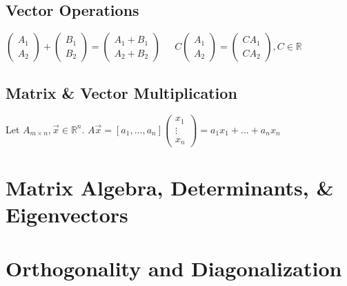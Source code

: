 \documentclass[5pt]{article}
\begin{document}
\begin{multicols}{2}
\subsection{Vector Operations}
$\begin{pmatrix}A_1\\ A_2\end{pmatrix}+\begin{pmatrix}B_1\\ B_2\end{pmatrix}=\begin{pmatrix}A_1+B_1\\ A_2+B_2\end{pmatrix}\;\;\;\;$
$C\begin{pmatrix}A_1\\ A_2\end{pmatrix}=\begin{pmatrix}CA_1\\ CA_2\end{pmatrix}, C\in\mathbb{R}$

\subsection{Matrix \& Vector Multiplication}
Let $A_{m\times n}, \vec{x}\in\mathbb{R}^n$. $A\vec{x}=\left[a_1, ...,a_n\right]\begin{pmatrix}x_1\\ \vdots\\ x_n\end{pmatrix}=a_1x_1 + ... + a_nx_n$


\section{Matrix Algebra, Determinants, \& Eigenvectors}

\section{Orthogonality and Diagonalization}

\end{multicols}
\end{document}
